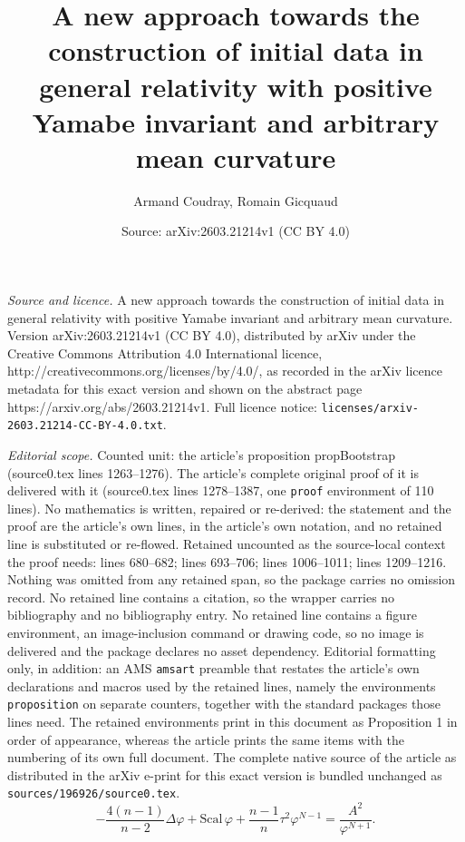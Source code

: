 \documentclass[10pt,a4paper]{amsart}
\title{A new approach towards the construction of initial data in general relativity with positive Yamabe invariant and arbitrary mean curvature}
\author{Armand Coudray, Romain Gicquaud}
\date{Source: arXiv:2603.21214v1 (CC BY 4.0)}
\renewcommand{\phi}{\varphi}
\newcommand{\scal}{\mathrm{Scal}}
\begin{document}
\maketitle

\noindent\emph{Source and licence.} A new approach towards the construction of initial data in general relativity with positive Yamabe invariant and arbitrary mean curvature. Version arXiv:2603.21214v1 (CC BY 4.0), distributed by arXiv under the Creative Commons Attribution 4.0 International licence, http://creativecommons.org/licenses/by/4.0/, as recorded in the arXiv licence metadata for this exact version and shown on the abstract page https://arxiv.org/abs/2603.21214v1. Full licence notice: \texttt{licenses/arxiv-2603.21214-CC-BY-4.0.txt}.\par\smallskip

\noindent\textit{Editorial scope.} Counted unit: the article's proposition propBootstrap (source0.tex lines 1263--1276). The article's complete original proof of it is delivered with it (source0.tex lines 1278--1387, one \texttt{proof} environment of 110 lines). No mathematics is written, repaired or re-derived: the statement and the proof are the article's own lines, in the article's own notation, and no retained line is substituted or re-flowed.  Retained uncounted as the source-local context the proof needs: lines 680--682; lines 693--706; lines 1006--1011; lines 1209--1216.  Nothing was omitted from any retained span, so the package carries no omission record.  No retained line contains a citation, so the wrapper carries no bibliography and no bibliography entry.  No retained line contains a figure environment, an image-inclusion command or drawing code, so no image is delivered and the package declares no asset dependency.  Editorial formatting only, in addition: an AMS \texttt{amsart} preamble that restates the article's own declarations and macros used by the retained lines, namely the environments \texttt{proposition} on separate counters, together with the standard packages those lines need.  The retained environments print in this document as Proposition 1 in order of appearance, whereas the article prints the same items with the numbering of its own full document.  The complete native source of the article as distributed in the arXiv e-print for this exact version is bundled unchanged as \texttt{sources/196926/source0.tex}.
\begin{equation} \label{eqLich}
    - \frac{4(n-1)}{n-2} \Delta \phi + \scal\,\phi + \frac{n-1}{n} \tau^2 \phi^{N-1} = \frac{A^2}{\phi^{N+1}}.
\end{equation}
\end{document}
